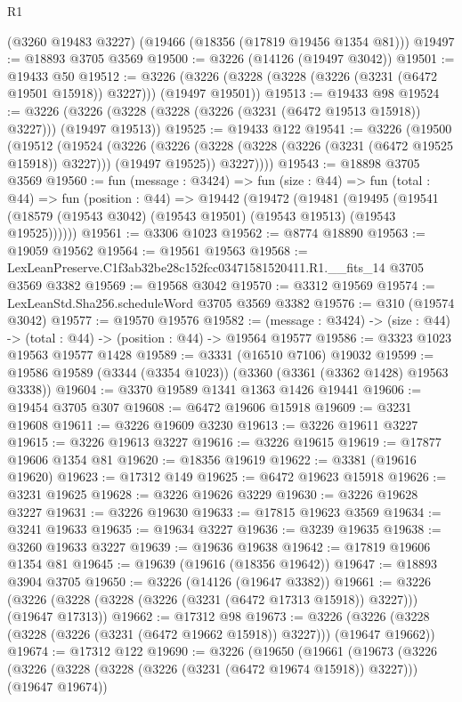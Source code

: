 \begin{lexlean}{R1}
\begin{coremodule}
    (@3260 @19483 @3227)
    (@19466 (@18356 (@17819 @19456 @1354 @81)))
@19497 := @18893 @3705 @3569
@19500 := @3226 (@14126 (@19497 @3042))
@19501 := @19433 @50
@19512 := @3226 (@3226 (@3228 (@3228 (@3226 (@3231 (@6472 @19501 @15918)) @3227))) (@19497 @19501))
@19513 := @19433 @98
@19524 := @3226 (@3226 (@3228 (@3228 (@3226 (@3231 (@6472 @19513 @15918)) @3227))) (@19497 @19513))
@19525 := @19433 @122
@19541 := @3226
    (@19500
      (@19512
        (@19524
          (@3226
            (@3226 (@3228 (@3228 (@3226 (@3231 (@6472 @19525 @15918)) @3227))) (@19497 @19525))
            @3227))))
@19543 := @18898 @3705 @3569
@19560 := fun (message : @3424) =>
  fun (size : @44) =>
  fun (total : @44) =>
  fun (position : @44) =>
  @19442
    (@19472
      (@19481
        (@19495 (@19541 (@18579 (@19543 @3042) (@19543 @19501) (@19543 @19513) (@19543 @19525))))))
@19561 := @3306 @1023
@19562 := @8774 @18890
@19563 := @19059 @19562
@19564 := @19561 @19563
@19568 := LexLeanPreserve.C1f3ab32be28c152fcc03471581520411.R1.__fits_14 @3705 @3569 @3382
@19569 := @19568 @3042
@19570 := @3312 @19569
@19574 := LexLeanStd.Sha256.scheduleWord @3705 @3569 @3382
@19576 := @310 (@19574 @3042)
@19577 := @19570 @19576
@19582 := (message : @3424) -> (size : @44) -> (total : @44) -> (position : @44) -> @19564 @19577
@19586 := @3323 @1023 @19563 @19577 @1428
@19589 := @3331 (@16510 @7106) @19032
@19599 := @19586 @19589 (@3344 (@3354 @1023)) (@3360 (@3361 (@3362 @1428) @19563 @3338))
@19604 := @3370 @19589 @1341 @1363 @1426 @19441
@19606 := @19454 @3705 @307
@19608 := @6472 @19606 @15918
@19609 := @3231 @19608
@19611 := @3226 @19609 @3230
@19613 := @3226 @19611 @3227
@19615 := @3226 @19613 @3227
@19616 := @3226 @19615
@19619 := @17877 @19606 @1354 @81
@19620 := @18356 @19619
@19622 := @3381 (@19616 @19620)
@19623 := @17312 @149
@19625 := @6472 @19623 @15918
@19626 := @3231 @19625
@19628 := @3226 @19626 @3229
@19630 := @3226 @19628 @3227
@19631 := @3226 @19630
@19633 := @17815 @19623 @3569
@19634 := @3241 @19633
@19635 := @19634 @3227
@19636 := @3239 @19635
@19638 := @3260 @19633 @3227
@19639 := @19636 @19638
@19642 := @17819 @19606 @1354 @81
@19645 := @19639 (@19616 (@18356 @19642))
@19647 := @18893 @3904 @3705
@19650 := @3226 (@14126 (@19647 @3382))
@19661 := @3226 (@3226 (@3228 (@3228 (@3226 (@3231 (@6472 @17313 @15918)) @3227))) (@19647 @17313))
@19662 := @17312 @98
@19673 := @3226 (@3226 (@3228 (@3228 (@3226 (@3231 (@6472 @19662 @15918)) @3227))) (@19647 @19662))
@19674 := @17312 @122
@19690 := @3226
    (@19650
      (@19661
        (@19673
          (@3226
            (@3226 (@3228 (@3228 (@3226 (@3231 (@6472 @19674 @15918)) @3227))) (@19647 @19674))

\end{coremodule}
\end{lexlean}
